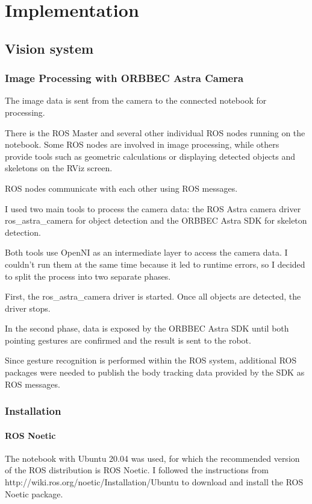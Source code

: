 \chapter{Implementation}

\section{Vision system}

\subsection{Image Processing with ORBBEC Astra Camera}
The image data is sent from the camera to the connected notebook for processing.\par
There is the ROS Master and several other individual ROS nodes running on the notebook. Some ROS nodes are involved in image processing, while others provide tools such as geometric calculations or displaying detected objects and skeletons on the RViz screen.\par
ROS nodes communicate with each other using ROS messages.\par
I used two main tools to process the camera data: the ROS Astra camera driver ros\_astra\_camera for object detection and the ORBBEC Astra SDK for skeleton detection.\par
Both tools use OpenNI as an intermediate layer to access the camera data. I couldn't run them at the same time because it led to runtime errors, so I decided to split the process into two separate phases.\par
First, the ros\_astra\_camera driver is started. Once all objects are detected, the driver stops.\par
In the second phase, data is exposed by the ORBBEC Astra SDK until both pointing gestures are confirmed and the result is sent to the robot. \par
Since gesture recognition is performed within the ROS system, additional ROS packages were needed to publish the body tracking data provided by the SDK as ROS messages.\par

\subsection{Installation}

\subsubsection{ROS Noetic}
The notebook with Ubuntu 20.04 was used, for which the recommended version of the ROS distribution is ROS Noetic. I followed the instructions from http://wiki.ros.org/noetic/Installation/Ubuntu to download and install the ROS Noetic package.\par

